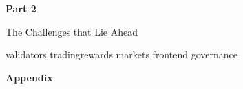 \documentclass[
        a4paper, %
	8pt, %
]{CSSullivanBusinessReport}
\begin{document}
\clearpage
\pagecolor{bg}
\color{white}
\begin{fullwidth} %
	\vspace*{-0.075\textheight} %
	\vspace{0.15\textheight} %
 	\parbox{0.9\fulltextwidth}{\fontsize{50pt}{52pt}\selectfont\raggedright\textbf{Part 2}\par} %
 
        \vspace{0.03\textheight} %
        
        {\Huge{The Challenges that Lie Ahead}\par} %
\end{fullwidth}
\clearpage
\pagecolor{white}
\color{black}


{validators}
\clearpage
{tradingrewards}
\clearpage
{markets}
\clearpage
{frontend}
\clearpage
{governance}
\clearpage


\newpage

\pagecolor{bg}
\color{white}

\begin{fullwidth} %

	\vspace*{-0.075\textheight} %
	
	\vspace{0.15\textheight} %

	\parbox{0.9\fulltextwidth}{\fontsize{50pt}{52pt}\selectfont\raggedright\textbf{Appendix}\par} %

\end{fullwidth}
\end{document}
